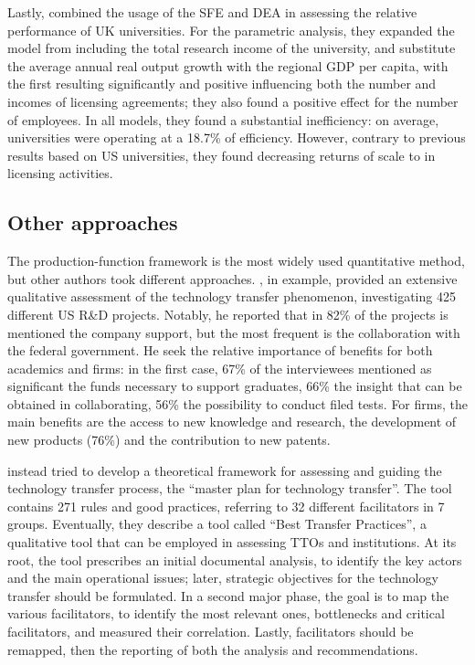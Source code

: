 Lastly, \citet{Chapple2005} combined the usage of the SFE and DEA in assessing the relative performance of UK universities. For the parametric analysis, they expanded the model from \citet{Siegel2003a} including the total research income of the university, and substitute the average annual real output growth with the regional GDP per capita, with the first resulting significantly and positive influencing both the number and incomes of licensing agreements; they also found a positive effect for the number of employees. In all models, they found a substantial inefficiency: on average, universities were operating at a 18.7\% of efficiency. However, contrary to previous results based on US universities, they found decreasing returns of scale to in licensing activities.

\subsection{Other approaches}

The production-function framework is the most widely used quantitative method, but other authors took different approaches. \citet{Lee2000}, in example, provided an extensive qualitative assessment of the technology transfer phenomenon, investigating 425 different US R\&D projects. Notably, he reported that in 82\% of the projects is mentioned the company support, but the most frequent is the collaboration with the federal government. He seek the relative importance of benefits for both academics and firms: in the first case, 67\% of the interviewees mentioned as significant the funds necessary to support graduates, 66\% the insight that can be obtained in collaborating, 56\% the possibility to conduct filed tests. For firms, the main benefits are the access to new knowledge and research, the development of new products (76\%) and the contribution to new patents.

\citet{Resende2013} instead tried to develop a theoretical framework for assessing and guiding the technology transfer process, the \enquote{master plan for technology transfer}. The tool contains 271 rules and good practices, referring to 32 different facilitators in 7 groups. Eventually, they describe a tool called \enquote{Best Transfer Practices}, a qualitative tool that can be employed in assessing TTOs and institutions. At its root, the tool prescribes an initial documental analysis, to identify the key actors and the main operational issues; later, strategic objectives for the technology transfer should be formulated. In a second major phase, the goal is to map the various facilitators, to identify the most relevant ones, bottlenecks and critical facilitators, and measured their correlation. Lastly, facilitators should be remapped, then the reporting of both the analysis and recommendations. 


